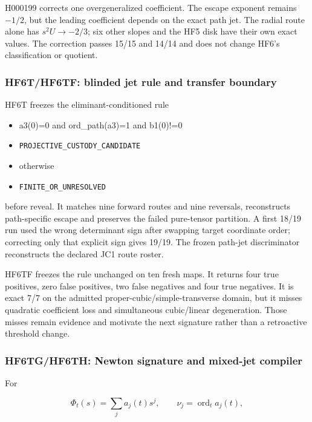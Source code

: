 H000199 corrects one overgeneralized coefficient. The escape exponent
remains \(-1/2\), but the leading coefficient depends on the exact path
jet. The radial route alone has \(s^2U\to-2/3\); six other slopes and
the HF5 disk have their own exact values. The correction passes 15/15
and 14/14 and does not change HF6's classification or quotient.

\subsubsection{HF6T/HF6TF: blinded jet rule and transfer
boundary}\label{viii-ch11-hf6thf6tf-blinded-jet-rule-and-transfer-boundary}

HF6T freezes the eliminant-conditioned rule

\begin{itemize}
\tightlist
\item
  a3(0)=0 and ord\_path(a3)=1 and b1(0)!=0
\item
  \nolinkurl{PROJECTIVE_CUSTODY_CANDIDATE}
\item
  otherwise
\item
  \nolinkurl{FINITE_OR_UNRESOLVED}
\end{itemize}

before reveal. It matches nine forward routes and nine reversals,
reconstructs path-specific escape and preserves the failed pure-tensor
partition. A first 18/19 run used the wrong determinant sign after
swapping target coordinate order; correcting only that explicit sign
gives 19/19. The frozen path-jet discriminator reconstructs the declared JC1 route roster.

HF6TF freezes the rule unchanged on ten fresh maps. It returns four true
positives, zero false positives, two false negatives and four true
negatives. It is exact 7/7 on the admitted
proper-cubic/simple-transverse domain, but it misses quadratic
coefficient loss and simultaneous cubic/linear degeneration. Those
misses remain evidence and motivate the next signature rather than a
retroactive threshold change.

\subsubsection{HF6TG/HF6TH: Newton signature and mixed-jet
compiler}\label{viii-ch11-hf6tghf6th-newton-signature-and-mixed-jet-compiler}

For

\[
\Phi_t(s)=\sum_j a_j(t)s^j,
\qquad
\nu_j=\operatorname{ord}_t a_j(t),
\]

